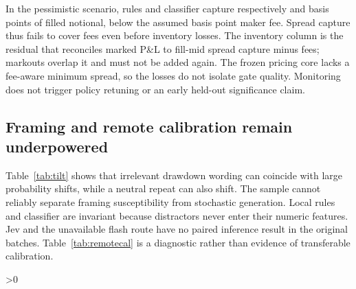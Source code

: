\documentclass[11pt]{article}
\begin{document}
In the pessimistic scenario, rules and classifier capture respectively
\ForwardRulesSpreadBp{} and \ForwardClassifierSpreadBp{} basis points of filled
notional, below the assumed \ForwardFeeBp{} basis point maker fee. Spread capture
thus fails to cover fees even before inventory losses. The inventory column is
the residual that reconciles marked P\&L to fill-mid spread capture minus fees;
markouts overlap it and must not be added again. The frozen pricing core lacks a
fee-aware minimum spread, so the losses do not isolate gate quality. Monitoring
does not trigger policy retuning or an early held-out significance claim.

\subsection{Framing and remote calibration remain underpowered}
\begin{table}[htbp]\centering\footnotesize

\caption{Paired signed probability shifts relative to neutral framing. Neutral
repeat is a separate fresh generation on the same features. Brackets show
descriptive paired-state bootstrap intervals, not UTC-block intervals; small $n$
is not evidence of invariance. A dash denotes fewer than two state pairs.}
\label{tab:tilt}\end{table}
\begin{table}[htbp]\centering\small

\caption{Sparse neutral remote calibration diagnostics. These use different tiny
state subsets from the full local pilot and cannot rank models against each other.}
\label{tab:remotecal}\end{table}
Table~\ref{tab:tilt} shows that irrelevant drawdown wording can coincide with large
probability shifts, while a neutral repeat can also shift. The sample cannot
reliably separate framing susceptibility from stochastic generation. Local rules
and classifier are invariant because distractors never enter their numeric
features. Jev and the unavailable flash route have no paired inference result
in the original batches.
Table~\ref{tab:remotecal} is a diagnostic rather than evidence of transferable
calibration.

\ifnum\FramingAttempted>0
\begin{table}[htbp]\centering\scriptsize

\caption{Bounded review framing extension, separate from the original batches.
Valid/tried counts judgments; $n_D,n_R$ count complete drawdown/neutral-repeat
pairs. Brackets are descriptive paired-state bootstrap intervals; missing pairs
are retained. No independent-day precision or model ranking is established.}
\label{tab:extension}\end{table}
\end{document}
